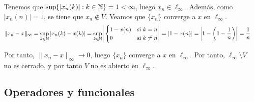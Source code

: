 \begin{ejercicio}
Tenemos que $\sup\{|x_n(k)| : k \in \mathbb{N}\} = 1 < \infty$, luego $x_n \in \ell_\infty$. Además, como $|x_n(n)| = 1$, se tiene que $x_n \notin V$. Veamos que $\{x_n\}$ converge a $x$ en $\ell_\infty$.
\begin{equation*}
    \|x_n - x\|_\infty = \sup_{k \in \mathbb{N}} |x_n(k) - x(k)| = \sup_{k \in \mathbb{N}} \left|\begin{cases}
        1 - x(n) & \text{si } k = n\\
        0 & \text{si } k \neq n
    \end{cases}\right| = |1 - x(n)| = \left|1 - \left(1 - \frac{1}{n}\right)\right| = \frac{1}{n}
\end{equation*}

Por tanto, $\|x_n - x\|_\infty \to 0$, luego $\{x_n\}$ converge a $x$ en $\ell_\infty$. Por tanto, $\ell_\infty \setminus V$ no es cerrado, y por tanto $V$ no es abierto en $\ell_\infty$.
\end{ejercicio}

\newpage\subsection{Operadores y funcionales}


